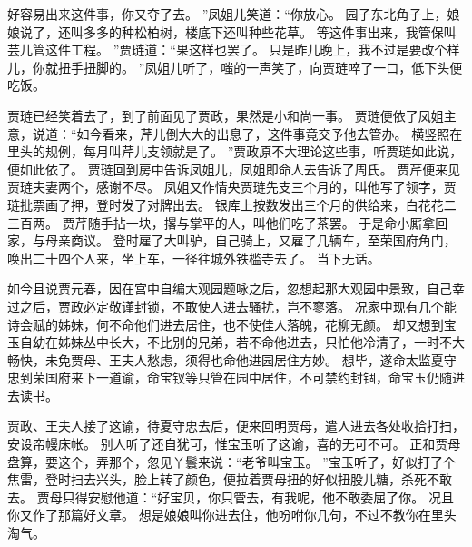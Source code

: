 好容易出来这件事，你又夺了去。
”凤姐儿笑道：“你放心。
园子东北角子上，娘娘说了，还叫多多的种松柏树，楼底下还叫种些花草。
等这件事出来，我管保叫芸儿管这件工程。
”贾琏道：“果这样也罢了。
只是昨儿晚上，我不过是要改个样儿，你就扭手扭脚的。
”凤姐儿听了，嗤的一声笑了，向贾琏啐了一口，低下头便吃饭。
\par
贾琏已经笑着去了，到了前面见了贾政，果然是小和尚一事。
贾琏便依了凤姐主意，说道：“如今看来，芹儿倒大大的出息了，这件事竟交予他去管办。
横竖照在里头的规例，每月叫芹儿支领就是了。
”贾政原不大理论这些事，听贾琏如此说，便如此依了。
贾琏回到房中告诉凤姐儿，凤姐即命人去告诉了周氏。
贾芹便来见贾琏夫妻两个，感谢不尽。
凤姐又作情央贾琏先支三个月的，叫他写了领字，贾琏批票画了押，登时发了对牌出去。
银库上按数发出三个月的供给来，白花花二三百两。
贾芹随手拈一块，撂与掌平的人，叫他们吃了茶罢。
于是命小厮拿回家，与母亲商议。
登时雇了大叫驴，自己骑上，又雇了几辆车，至荣国府角门，唤出二十四个人来，坐上车，一径往城外铁槛寺去了。
当下无话。
\par
如今且说贾元春，因在宫中自编大观园题咏之后，忽想起那大观园中景致，自己幸过之后，贾政必定敬谨封锁，不敢使人进去骚扰，岂不寥落。
况家中现有几个能诗会赋的姊妹，何不命他们进去居住，也不使佳人落魄，花柳无颜。
却又想到宝玉自幼在姊妹丛中长大，不比别的兄弟，若不命他进去，只怕他冷清了，一时不大畅快，未免贾母、王夫人愁虑，须得也命他进园居住方妙。
想毕，遂命太监夏守忠到荣国府来下一道谕，命宝钗等只管在园中居住，不可禁约封锢，命宝玉仍随进去读书。
\par
贾政、王夫人接了这谕，待夏守忠去后，便来回明贾母，遣人进去各处收拾打扫，安设帘幔床帐。
别人听了还自犹可，惟宝玉听了这谕，喜的无可不可。
正和贾母盘算，要这个，弄那个，忽见丫鬟来说：“老爷叫宝玉。
”宝玉听了，好似打了个焦雷，登时扫去兴头，脸上转了颜色，便拉着贾母扭的好似扭股儿糖，杀死不敢去。
贾母只得安慰他道：“好宝贝，你只管去，有我呢，他不敢委屈了你。
况且你又作了那篇好文章。
想是娘娘叫你进去住，他吩咐你几句，不过不教你在里头淘气。
